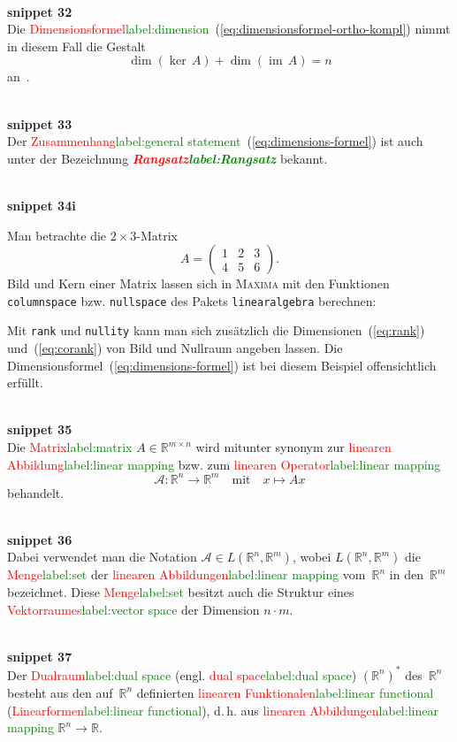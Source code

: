\documentclass[a4paper,twoside,english,ngerman,deutsch,german,sectrefs,envcountsame,envcountchap]{svmono}
\newcommand{\setref}[2]{\textcolor{red}{#1}\textcolor{green}{#2}}
\newcommand{\snippet}[1]{\\\textbf{snippet #1}\\}
\begin{document}
\snippet{32}
Die \setref{Dimensionsformel}{label:dimension}~(\ref{eq:dimensionsformel-ortho-kompl}) nimmt in diesem Fall die Gestalt
\begin{equation}
\dim(\ker\,A)+\dim({\operatorname{im}}\,A)=n\label{eq:dimensions-formel}
\end{equation}
an~\cite{lorenz1992,beutelspacher2001}.

\snippet{33}
Der \setref{Zusammenhang}{label:general statement}~(\ref{eq:dimensions-formel}) ist auch unter der Bezeichnung \textbf{\em \setref{Rangsatz}{label:Rangsatz}} bekannt.

\snippet{34i}

\begin{example}
\label{exa:Bild-und-Kern}Man betrachte die $2\times3$-Matrix
\[
A=\left(\begin{array}{ccc} 1 & 2 & 3\\ 4 & 5 & 6
\end{array}\right).
\]
Bild und Kern einer Matrix lassen sich in \textsc{Maxima} mit den Funktionen \texttt{columnspace} bzw. \texttt{nullspace} des Pakets
\texttt{linearalgebra} berechnen:



Mit \texttt{rank} und \texttt{nullity} kann man sich zusätzlich die Dimensionen~(\ref{eq:rank}) und~(\ref{eq:corank}) von Bild und Nullraum angeben lassen. Die Dimensionsformel~(\ref{eq:dimensions-formel}) ist bei diesem Beispiel offensichtlich erfüllt.

\end{example}

\snippet{35}
Die \setref{Matrix}{label:matrix} $A\in{\mathbb{R}}^{m\times n}$ wird mitunter synonym zur \setref{linearen Abbildung}{label:linear mapping} bzw. zum \setref{linearen Operator}{label:linear mapping}
\[
\mathcal{A}:{\mathbb{R}}^{n}\to{\mathbb{R}}^{m}\quad\text{mit}\quad x\mapsto Ax
\]
behandelt.

\snippet{36}
Dabei verwendet man die Notation $\mathcal{A}\in L({\mathbb{R}}^{n},{\mathbb{R}}^{m})$, wobei $L({\mathbb{R}}^{n},{\mathbb{R}}^{m})$ die \setref{Menge}{label:set} der \setref{linearen Abbildungen}{label:linear mapping} vom~${\mathbb{R}}^{n}$ in den~${\mathbb{R}}^{m}$ bezeichnet. Diese \setref{Menge}{label:set} besitzt auch die Struktur eines \setref{Vektorraumes}{label:vector space} der Dimension $n\cdot m$.

\snippet{37}
Der \setref{Dualraum}{label:dual space} (engl. \setref{dual space}{label:dual space}) $({\mathbb{R}}^{n})^{*}$ des~${\mathbb{R}}^{n}$ besteht aus den auf~${\mathbb{R}}^{n}$ definierten \setref{linearen Funktionalen}{label:linear functional} (\setref{Linearformen}{label:linear functional}), d.\,h. aus \setref{linearen Abbildungen}{label:linear mapping} ${\mathbb{R}}^{n}\to{\mathbb{R}}$.
\end{document}
